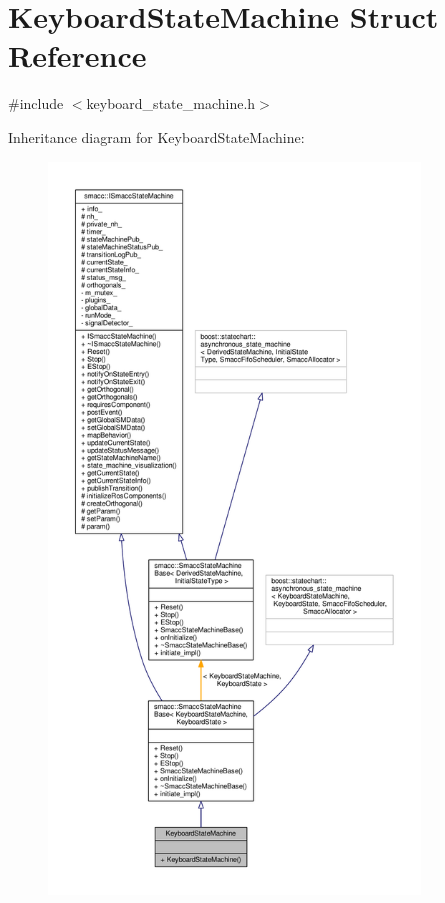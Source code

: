 \hypertarget{structKeyboardStateMachine}{}\section{Keyboard\+State\+Machine Struct Reference}
\label{structKeyboardStateMachine}


{\ttfamily \#include $<$keyboard\+\_\+state\+\_\+machine.\+h$>$}



Inheritance diagram for Keyboard\+State\+Machine\+:
\nopagebreak
\begin{figure}[H]
\begin{center}
\leavevmode
\includegraphics[height=550pt]{structKeyboardStateMachine__inherit__graph}
\end{center}
\end{figure}


